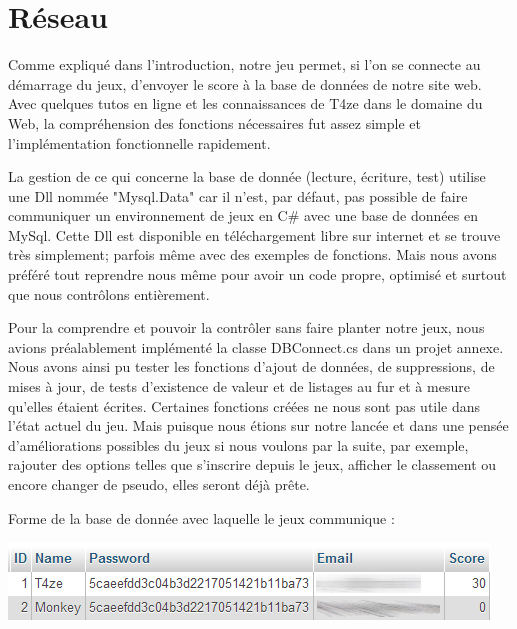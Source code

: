 \documentclass [11pt]{report}
\begin{document}
	\section{Réseau}
	Comme expliqué dans l'introduction, notre jeu permet, si l'on se connecte au démarrage du jeux, d'envoyer le score à la base de données de notre site web.\\
	
	Avec quelques tutos en ligne et les connaissances de T4ze dans le domaine du Web, la compréhension des fonctions nécessaires fut assez simple et l'implémentation fonctionnelle rapidement.
	
	La gestion de ce qui concerne la base de donnée (lecture, écriture, test) utilise une Dll nommée "Mysql.Data" car il n'est, par défaut, pas possible de faire communiquer un environnement de jeux en C\# avec une base de données en MySql. Cette Dll est disponible en téléchargement libre sur internet et se trouve très simplement; parfois même avec des exemples de fonctions. Mais nous avons préféré tout reprendre nous même pour avoir un code propre, optimisé et surtout que nous contrôlons entièrement.
	
	Pour la comprendre et pouvoir la contrôler sans faire planter notre jeux, nous avions préalablement implémenté la classe DBConnect.cs dans un projet annexe. Nous avons ainsi pu tester les fonctions d'ajout de données, de suppressions, de mises à jour, de tests d'existence de valeur et de listages au fur et à mesure qu'elles étaient écrites. Certaines fonctions créées ne nous sont pas utile dans l'état actuel du jeu. Mais puisque nous étions sur notre lancée et dans une pensée d'améliorations possibles du jeux si nous voulons par la suite, par exemple, rajouter des options telles que s'inscrire depuis le jeux, afficher le classement ou encore changer de pseudo, elles seront déjà prête.\\
	
	\vspace{4mm}
	
	\noindent Forme de la base de donnée avec laquelle le jeux communique :
	\begin{center}
		\includegraphics[scale = 0.8]{images/Bdd.png}
	\end{center}
		
\end{document}
